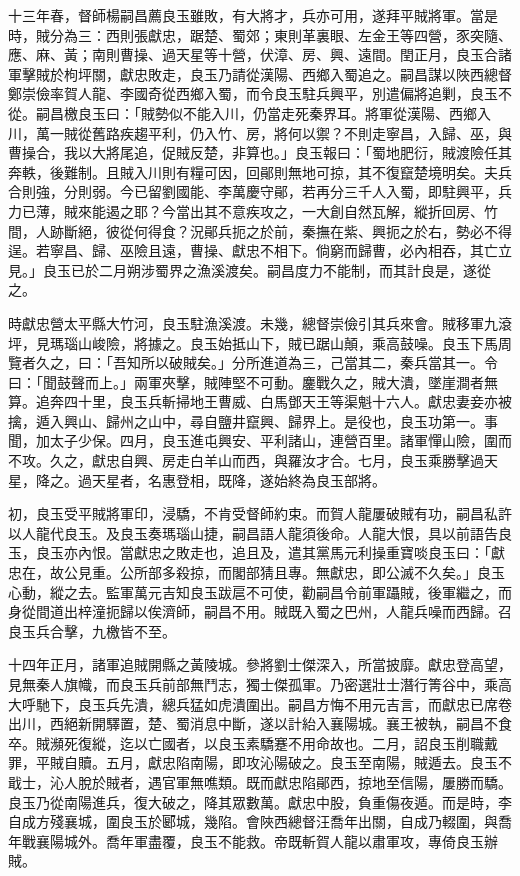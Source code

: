 \begin{pinyinscope}
十三年春，督師楊嗣昌薦良玉雖敗，有大將才，兵亦可用，遂拜平賊將軍。當是時，賊分為三：西則張獻忠，踞楚、蜀郊；東則革裏眼、左金王等四營，豕突隨、應、麻、黃；南則曹操、過天星等十營，伏漳、房、興、遠間。閏正月，良玉合諸軍擊賊於枸坪關，獻忠敗走，良玉乃請從漢陽、西鄉入蜀追之。嗣昌謀以陜西總督鄭崇儉率賀人龍、李國奇從西鄉入蜀，而令良玉駐兵興平，別遣偏將追剿，良玉不從。嗣昌檄良玉曰：「賊勢似不能入川，仍當走死秦界耳。將軍從漢陽、西鄉入川，萬一賊從舊路疾趨平利，仍入竹、房，將何以禦？不則走寧昌，入歸、巫，與曹操合，我以大將尾追，促賊反楚，非算也。」良玉報曰：「蜀地肥衍，賊渡險任其奔軼，後難制。且賊入川則有糧可因，回鄖則無地可掠，其不復竄楚境明矣。夫兵合則強，分則弱。今已留劉國能、李萬慶守鄖，若再分三千人入蜀，即駐興平，兵力已薄，賊來能遏之耶？今當出其不意疾攻之，一大創自然瓦解，縱折回房、竹間，人跡斷絕，彼從何得食？況鄖兵扼之於前，秦撫在紫、興扼之於右，勢必不得逞。若寧昌、歸、巫險且遠，曹操、獻忠不相下。倘窮而歸曹，必內相吞，其亡立見。」良玉已於二月朔涉蜀界之漁溪渡矣。嗣昌度力不能制，而其計良是，遂從之。

時獻忠營太平縣大竹河，良玉駐漁溪渡。未幾，總督崇儉引其兵來會。賊移軍九滾坪，見瑪瑙山峻險，將據之。良玉始抵山下，賊已踞山顛，乘高鼓噪。良玉下馬周覽者久之，曰：「吾知所以破賊矣。」分所進道為三，己當其二，秦兵當其一。令曰：「聞鼓聲而上。」兩軍夾擊，賊陣堅不可動。鏖戰久之，賊大潰，墜崖澗者無算。追奔四十里，良玉兵斬掃地王曹威、白馬鄧天王等渠魁十六人。獻忠妻妾亦被擒，遁入興山、歸州之山中，尋自鹽井竄興、歸界上。是役也，良玉功第一。事聞，加太子少保。四月，良玉進屯興安、平利諸山，連營百里。諸軍憚山險，圍而不攻。久之，獻忠自興、房走白羊山而西，與羅汝才合。七月，良玉乘勝擊過天星，降之。過天星者，名惠登相，既降，遂始終為良玉部將。

初，良玉受平賊將軍印，浸驕，不肯受督師約束。而賀人龍屢破賊有功，嗣昌私許以人龍代良玉。及良玉奏瑪瑙山捷，嗣昌語人龍須後命。人龍大恨，具以前語告良玉，良玉亦內恨。當獻忠之敗走也，追且及，遣其黨馬元利操重寶啖良玉曰：「獻忠在，故公見重。公所部多殺掠，而閣部猜且專。無獻忠，即公滅不久矣。」良玉心動，縱之去。監軍萬元吉知良玉跋扈不可使，勸嗣昌令前軍躡賊，後軍繼之，而身從間道出梓潼扼歸以俟濟師，嗣昌不用。賊既入蜀之巴州，人龍兵噪而西歸。召良玉兵合擊，九檄皆不至。

十四年正月，諸軍追賊開縣之黃陵城。參將劉士傑深入，所當披靡。獻忠登高望，見無秦人旗幟，而良玉兵前部無鬥志，獨士傑孤軍。乃密選壯士潛行箐谷中，乘高大呼馳下，良玉兵先潰，總兵猛如虎潰圍出。嗣昌方悔不用元吉言，而獻忠已席卷出川，西絕新開驛置，楚、蜀消息中斷，遂以計紿入襄陽城。襄王被執，嗣昌不食卒。賊瀕死復縱，迄以亡國者，以良玉素驕蹇不用命故也。二月，詔良玉削職戴罪，平賊自贖。五月，獻忠陷南陽，即攻沁陽破之。良玉至南陽，賊遁去。良玉不戢士，沁人脫於賊者，遇官軍無噍類。既而獻忠陷鄖西，掠地至信陽，屢勝而驕。良玉乃從南陽進兵，復大破之，降其眾數萬。獻忠中股，負重傷夜遁。而是時，李自成方殘襄城，圍良玉於郾城，幾陷。會陜西總督汪喬年出關，自成乃輟圍，與喬年戰襄陽城外。喬年軍盡覆，良玉不能救。帝既斬賀人龍以肅軍攻，專倚良玉辦賊。


\end{pinyinscope}
